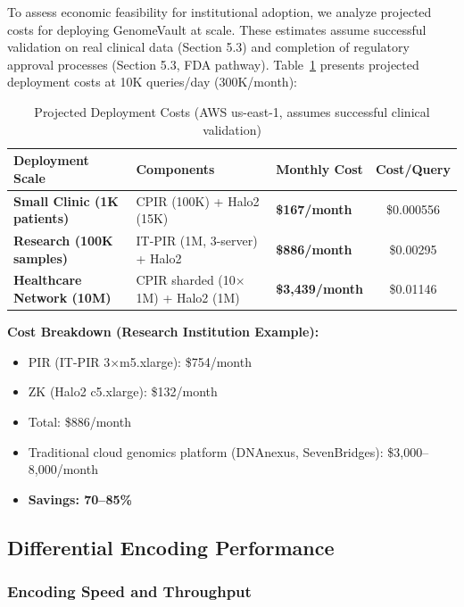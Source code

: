 \documentclass[11pt,letterpaper]{article}
\begin{document}
To assess economic feasibility for institutional adoption, we analyze projected costs for deploying GenomeVault at scale. These estimates assume successful validation on real clinical data (Section 5.3) and completion of regulatory approval processes (Section 5.3, FDA pathway). Table~\ref{tab:deployment_costs} presents projected deployment costs at 10K queries/day (300K/month):

\begin{table}[!ht]
\centering
\caption{Projected Deployment Costs (AWS us-east-1, assumes successful clinical validation)}
\label{tab:deployment_costs}
\begin{tabular}{lllc}
\toprule
\textbf{Deployment Scale} & \textbf{Components} & \textbf{Monthly Cost} & \textbf{Cost/Query} \\
\midrule
\textbf{Small Clinic (1K patients)} & CPIR (100K) + Halo2 (15K) & \textbf{\$167/month} & \$0.000556 \\
\textbf{Research (100K samples)} & IT-PIR (1M, 3-server) + Halo2 & \textbf{\$886/month} & \$0.00295 \\
\textbf{Healthcare Network (10M)} & CPIR sharded (10$\times$1M) + Halo2 (1M) & \textbf{\$3,439/month} & \$0.01146 \\
\bottomrule
\end{tabular}
\label{tab:deployment_costs}
\end{table}

\textbf{Cost Breakdown (Research Institution Example):}
\begin{itemize}
\item PIR (IT-PIR 3$\times$m5.xlarge): \$754/month
\item ZK (Halo2 c5.xlarge): \$132/month
\item Total: \$886/month
\item Traditional cloud genomics platform (DNAnexus, SevenBridges): \$3,000--8,000/month
\item \textbf{Savings: 70--85\%}
\end{itemize}

\subsection{Differential Encoding Performance}

\subsubsection{Encoding Speed and Throughput}
\end{document}
